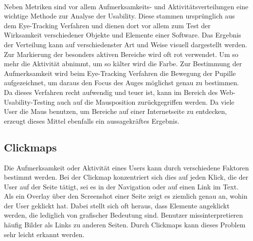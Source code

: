 \\
Neben Metriken sind vor allem Aufmerksamkeits- und Aktivitätsverteilungen eine wichtige Methode zur Analyse der Usability. Diese stammen ursprünglich aus dem Eye-Tracking Verfahren und dienen dort vor allem zum Test der Wirksamkeit verschiedener Objekte und Elemente einer Software. Das Ergebnis der Verteilung kann auf verschiedenster Art und Weise visuell dargestellt werden. Zur Markierung der besonders aktiven Bereiche wird oft rot verwendet. Um so mehr die Aktivität abnimmt, um so kälter wird die Farbe. Zur Bestimmung der Aufmerksamkeit wird beim Eye-Tracking Verfahren die Bewegung der Pupille aufgezeichnet, um daraus den Focus des Auges möglichst genau zu bestimmen. Da dieses Verfahren recht aufwendig und teuer ist, kann im Bereich des Web-Usability-Testing auch auf die Mausposition zurückgegriffen werden. Da viele User die Maus benutzen, um Bereiche auf einer Internetseite zu entdecken, erzeugt dieses Mittel ebenfalls ein aussagekräftes Ergebnis.


\subsection{Clickmaps}

Die Aufmerksamkeit oder Aktivität eines Users kann durch verschiedene Faktoren bestimmt werden. Bei der Clickmap konzentriert sich dies auf jeden Klick, die der User auf der Seite tätigt, sei es in der Navigation oder auf einen Link im Text. Als ein Overlay über den Screenshot einer Seite zeigt es ziemlich genau an, wohin der User geklickt hat. Dabei stellt sich oft heraus, dass Elemente angeklickt werden, die lediglich von grafischer Bedeutung sind. Benutzer missinterpretieren häufig Bilder als Links zu anderen Seiten. Durch Clickmaps kann dieses Problem sehr leicht erkannt werden.

